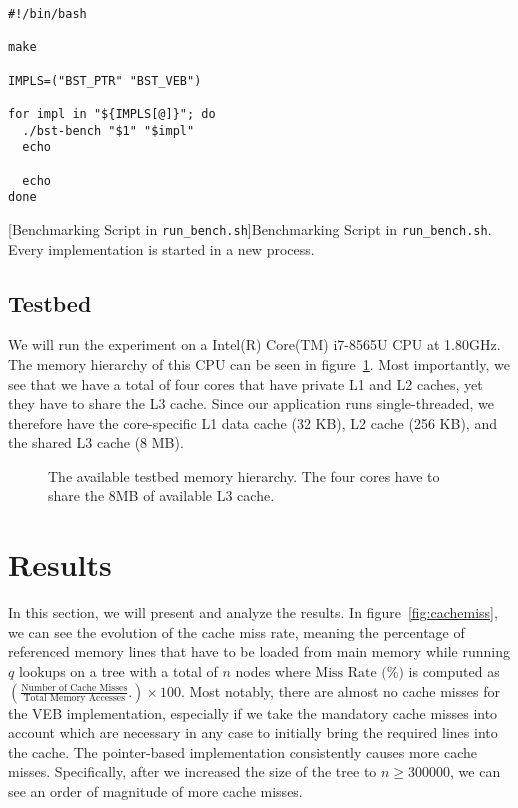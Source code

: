 \documentclass{article}
\begin{document}
\begin{lstlisting}
#!/bin/bash

make

IMPLS=("BST_PTR" "BST_VEB")    

for impl in "${IMPLS[@]}"; do
  ./bst-bench "$1" "$impl"
  echo
   
  echo
done
\end{lstlisting}
[Benchmarking Script in \texttt{run\_bench.sh}]{Benchmarking Script in \texttt{run\_bench.sh}. Every implementation is started in a new process.}
\label{ls:script}

\subsection{Testbed}
We will run the experiment on a Intel(R) Core(TM) i7-8565U CPU at 1.80GHz. The memory hierarchy of this CPU can be seen in figure~\ref{fig:topo}. Most importantly, we see that we have a total of four cores that have private L1 and L2 caches, yet they have to share the L3 cache. Since our application runs single-threaded, we therefore have the core-specific L1 data cache (32 KB), L2 cache (256 KB), and the shared L3 cache (8 MB). 
\begin{figure}[H]
  \centering
  \resizebox{0.7\linewidth}{!}{}
  \caption[Testbed Memory Hierarchy]{The available testbed memory hierarchy. The four cores have to share the  8MB of available L3 cache.}
  \label{fig:topo}
\end{figure}

\section{Results}
\label{sec:res}
In this section, we will present and analyze the results. In figure~\ref{fig:cachemiss}, we can see the evolution of the cache miss rate, meaning the percentage of referenced memory lines that have to be loaded from main memory while running $q$ lookups on a tree with a total of $n$ nodes where $\text{Miss Rate (\%)}$ is computed as $\left( \frac{\text{Number of Cache Misses}}{\text{Total Memory Accesses}}. \right) \times 100$. Most notably, there are almost no cache misses for the VEB implementation, especially if we take the mandatory cache misses into account which are necessary in any case to initially bring the required lines into the cache. The pointer-based implementation consistently causes more cache misses. Specifically, after we increased the size of the tree to $n \ge 300000$, we can see an order of magnitude of more cache misses. 
\end{document}
